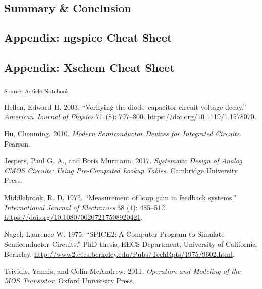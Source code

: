 \documentclass[
  a4paper,
  DIV=11,
  numbers=noendperiod]{scrartcl}
\newlength{\cslhangindent}
\newenvironment{CSLReferences}[2] %
 {\begin{list}{}{%
  \setlength{\itemindent}{0pt}
  \setlength{\leftmargin}{0pt}
  \setlength{\parsep}{0pt}
  \ifodd #1
   \setlength{\leftmargin}{\cslhangindent}
   \setlength{\itemindent}{-1\cslhangindent}
  \fi
  \setlength{\itemsep}{#2\baselineskip}}}
 {\end{list}}
\begin{document}
\subsection{Summary \& Conclusion}\label{summary-conclusion}

\subsection{Appendix: ngspice Cheat
Sheet}\label{appendix-ngspice-cheat-sheet}

\subsection{Appendix: Xschem Cheat
Sheet}\label{appendix-xschem-cheat-sheet}

\textsubscript{Source:
\href{https://iic-jku.github.io/analog-circuit-design/index.qmd.html}{Article
Notebook}}

\label{refs}
\begin{CSLReferences}{1}{0}
Hellen, Edward H. 2003. {``{Verifying the diode--capacitor circuit
voltage decay}.''} \emph{American Journal of Physics} 71 (8): 797--800.
\url{https://doi.org/10.1119/1.1578070}.

Hu, Chenming. 2010. \emph{Modern Semiconductor Devices for Integrated
Circuits}. Pearson.

Jespers, Paul G. A., and Boris Murmann. 2017. \emph{Systematic Design of
Analog CMOS Circuits: Using Pre-Computed Lookup Tables}. Cambridge
University Press.

Middlebrook, R. D. 1975. {``{Measurement of loop gain in feedback
systems}.''} \emph{International Journal of Electronics} 38 (4):
485--512. \url{https://doi.org/10.1080/00207217508920421}.

Nagel, Laurence W. 1975. {``SPICE2: A Computer Program to Simulate
Semiconductor Circuits.''} PhD thesis, EECS Department, University of
California, Berkeley.
\url{http://www2.eecs.berkeley.edu/Pubs/TechRpts/1975/9602.html}.

Tsividis, Yannis, and Colin McAndrew. 2011. \emph{Operation and Modeling
of the MOS Transistor}. Oxford University Press.

\end{CSLReferences}
\end{document}
